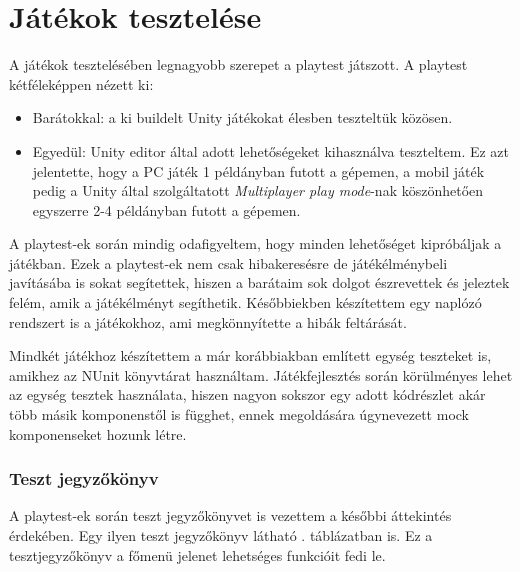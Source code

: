 \documentclass[]{thesis-ekf}
\theoremstyle{definition}
\theoremstyle{remark}
\begin{document}
\section{Játékok tesztelése}
A játékok tesztelésében legnagyobb szerepet a playtest játszott. A playtest kétféleképpen nézett ki:

\begin{itemize}
	\item Barátokkal: a ki buildelt Unity játékokat élesben teszteltük közösen.
	\item Egyedül: Unity editor által adott lehetőségeket kihasználva teszteltem. Ez azt jelentette, hogy a PC játék 1 példányban futott a gépemen, a mobil játék pedig a Unity által szolgáltatott \emph{Multiplayer play mode}-nak köszönhetően egyszerre 2-4 példányban futott a gépemen. \cite{UnityMultiplayerPlayMode}
\end{itemize}

A playtest-ek során mindig odafigyeltem, hogy minden lehetőséget kipróbáljak a játékban. Ezek a playtest-ek nem csak hibakeresésre de játékélménybeli javításába is sokat segítettek, hiszen a barátaim sok dolgot észrevettek és jeleztek felém, amik a játékélményt segíthetik. Későbbiekben készítettem egy naplózó rendszert is a játékokhoz, ami megkönnyítette a hibák feltárását.

Mindkét játékhoz készítettem a már korábbiakban említett egység teszteket is, amikhez az NUnit könyvtárat használtam. Játékfejlesztés során körülményes lehet az egység tesztek használata, hiszen nagyon sokszor egy adott kódrészlet akár több másik komponenstől is függhet, ennek megoldására úgynevezett mock komponenseket hozunk létre. \cite{NUnit}

\subsubsection{Teszt jegyzőkönyv}

A playtest-ek során teszt jegyzőkönyvet is vezettem a későbbi áttekintés érdekében. Egy ilyen teszt jegyzőkönyv látható . táblázatban is. Ez a tesztjegyzőkönyv a főmenü jelenet lehetséges funkcióit fedi le.
\end{document}
